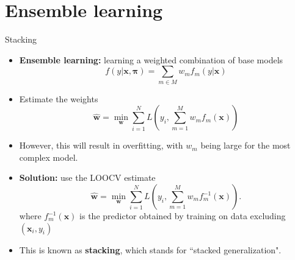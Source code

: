 \documentclass[10pt,mathserif]{beamer}
\begin{document}
\section{Ensemble learning}
\begin{frame}{Stacking}
\begin{itemize}
    \item \textbf{Ensemble learning:} learning a weighted combination of base models
    \begin{equation*}
        f(y|\bm{x},\bm{\pi})=   \sum_{m\in M}w_m f_m(y|\bm{x})
    \end{equation*}
    \item Estimate the weights
    \begin{equation*}
        \hat{\bm{w}} = \min_{\bm{w}} \sum_{i=1}^N L(y_i,\sum_{m=1}^M w_m f_m(\bm{x}))
    \end{equation*}
    \item However, this will result in overfitting, with $w_m$ being large for the most complex model.
    \item \textbf{Solution:} use the LOOCV estimate
    \begin{equation*}
        \hat{\bm{w}} = \min_{\bm{w}} \sum_{i=1}^N L(y_i,\sum_{m=1}^M w_m f_m^{-1}(\bm{x})).
    \end{equation*}
    where $f_m^{-1}(\bm{x})$ is the predictor obtained by training on data excluding $(\bm{x}_i, y_i)$
    \item This is known as \textbf{stacking}, which stands for ``stacked generalization". 
\end{itemize}
\end{frame}
\end{document}
